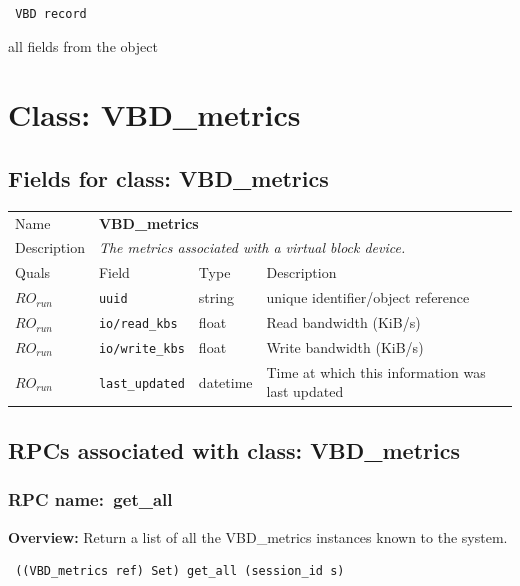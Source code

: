 \vspace{0.3cm}

{\tt 
VBD record
}


all fields from the object
\vspace{0.3cm}
\vspace{0.3cm}
\vspace{0.3cm}

\vspace{1cm}
\newpage
\section{Class: VBD\_metrics}
\subsection{Fields for class: VBD\_metrics}
\begin{longtable}{|lllp{}|}
\hline
\multicolumn{1}{|l}{Name} & \multicolumn{3}{l|}{\bf VBD\_metrics} \\
\multicolumn{1}{|l}{Description} & \multicolumn{3}{l|}{\parbox{11cm}{\em
The metrics associated with a virtual block device.}} \\
\hline
Quals & Field & Type & Description \\
\hline
$\mathit{RO}_\mathit{run}$ &  {\tt uuid} & string & unique identifier/object reference \\
$\mathit{RO}_\mathit{run}$ &  {\tt io/read\_kbs} & float & Read bandwidth (KiB/s) \\
$\mathit{RO}_\mathit{run}$ &  {\tt io/write\_kbs} & float & Write bandwidth (KiB/s) \\
$\mathit{RO}_\mathit{run}$ &  {\tt last\_updated} & datetime & Time at which this information was last updated \\
\hline
\end{longtable}
\subsection{RPCs associated with class: VBD\_metrics}
\subsubsection{RPC name:~get\_all}

{\bf Overview:} 
Return a list of all the VBD\_metrics instances known to the system.

\begin{verbatim} ((VBD_metrics ref) Set) get_all (session_id s)\end{verbatim}


